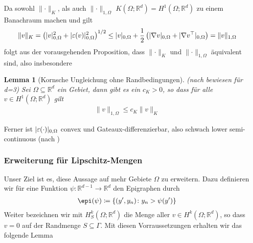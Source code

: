 \documentclass{scrartcl}
\newcounter{everything}
\newtheorem{lemma}[everything]{Lemma}
\def\R{\mathbb{R}}
\def\e{\varepsilon}
\newcommand{\norm}[1]{\lVert #1 \rVert}
\DeclarePairedDelimiter{\abs}{|}{|}
\begin{document}
Da sowohl $\norm{\cdot}_K$, als auch $\norm{\cdot}_{1,\Omega}$ $K(\Omega;\R^d)=H^1(\Omega;\R^d)$ zu einem Banachraum machen und gilt
\begin{align*}
	\norm{v}_K = \left(\abs{v}_{0,\Omega}^2 + \abs{\e(v)}_{0,\Omega}^2\right)^{1/2} \leq \abs{v}_{0,\Omega}+\frac{1}{2}\left(\abs{\nabla v}_{0,\Omega}+\abs{\nabla v^\top}_{0,\Omega}\right) = \norm{v}_{1,\Omega}
\end{align*}
folgt aus der vorausgehenden Proposition, dass $\norm{\cdot}_K$ und $\norm{\cdot}_{1,\Omega}$ äquivalent sind, also insbesondere

\begin{lemma}[Kornsche Ungleichung ohne Randbedingungen]
	(nach \cite{Cia-1997} bewiesen für d=3)
	Sei $\Omega\subseteq\R^d$ ein Gebiet, dann gibt es ein $c_K>0$, so dass für alle $v\in H^1(\Omega;\R^d)$ gilt
	\begin{align*}
		\norm{v}_{1,\Omega}\leq c_K\norm{v}_K
	\end{align*}
\end{lemma}


Ferner ist $\abs{\e(\cdot)}_{0,\Omega}$ convex und Gateaux-differenzierbar, also schwach lower semi-continuous (nach \cite{Kik-1988})

\subsubsection*{Erweiterung für Lipschitz-Mengen}
Unser Ziel ist es, diese Aussage auf mehr Gebiete $\Omega$ zu erweitern.
Dazu definieren wir für eine Funktion $\psi\colon\R^{d-1}\to\R^d$ den Epigraphen durch
\begin{align*}
	\epi(\psi)\coloneqq\{(y',y_n)\colon y_n>\psi(y')\}
\end{align*}
Weiter bezeichnen wir mit $H^k_S(\Omega;\R^d)$ die Menge aller $v\in H^k(\Omega;\R^d)$, so dass $v=0$ auf der Randmenge $S\subseteq\Gamma$.
Mit diesen Vorraussetzungen erhalten wir das folgende Lemma
\end{document}
